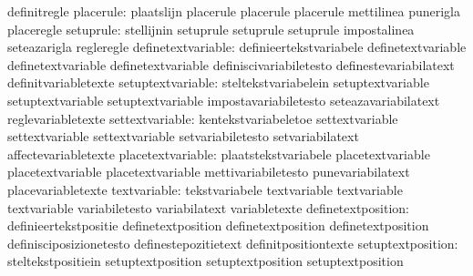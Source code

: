                                   definitregle
                       placerule: plaatslijn                       placerule
                                  placerule                        placerule
                                  mettilinea                       punerigla
                                  placeregle
                       setuprule: stellijnin                       setuprule
                                  setuprule                        setuprule
                                  impostalinea                     seteazarigla
                                  regleregle
              definetextvariable: definieertekstvariabele          definetextvariable
                                  definetextvariable               definetextvariable
                                  definiscivariabiletesto          definestevariabilatext
                                  definitvariabletexte
               setuptextvariable: steltekstvariabelein             setuptextvariable
                                  setuptextvariable                setuptextvariable
                                  impostavariabiletesto            seteazavariabilatext
                                  reglevariabletexte
                 settextvariable: kentekstvariabeletoe             settextvariable
                                  settextvariable                  settextvariable
                                  setvariabiletesto                setvariabilatext
                                  affectevariabletexte
               placetextvariable: plaatstekstvariabele             placetextvariable
                                  placetextvariable                placetextvariable
                                  mettivariabiletesto              punevariabilatext
                                  placevariabletexte
                    textvariable: tekstvariabele                   textvariable
                                  textvariable                     textvariable
                                  variabiletesto                   variabilatext
                                  variabletexte
              definetextposition: definieertekstpositie            definetextposition
                                  definetextposition               definetextposition
                                  definisciposizionetesto          definestepozitietext
                                  definitpositiontexte
               setuptextposition: steltekstpositiein               setuptextposition
                                  setuptextposition                setuptextposition

